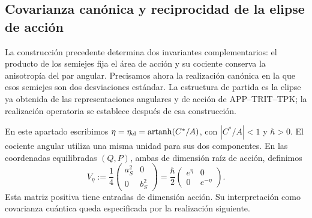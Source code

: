 
\subsection{Covarianza canónica y reciprocidad de la elipse de acción}
\label{sec:ii-area-covarianza}

La construcción precedente determina dos invariantes complementarios:
el producto de los semiejes fija el área de acción y su cociente conserva
la anisotropía del par angular. Precisamos ahora la realización canónica
en la que esos semiejes son dos desviaciones estándar. La estructura de
partida es la elipse ya obtenida de las representaciones angulares y de
acción de APP--TRIT--TPK; la realización operatoria se establece después
de esa construcción.

En este apartado escribimos \(\eta=\eta_{\rm el}
=\operatorname{artanh}(C^*/A)\), con \(|C^*/A|<1\) y
\(\hbar>0\). El cociente angular utiliza una misma unidad para sus dos
componentes. En las coordenadas equilibradas \((Q,P)\), ambas de
dimensión raíz de acción, definimos
\begin{equation}
 V_\eta:=\frac14
 \begin{pmatrix}a_S^2&0\\0&b_S^2\end{pmatrix}
 =\frac{\hbar}{2}
 \begin{pmatrix}e^\eta&0\\0&e^{-\eta}\end{pmatrix}.
 \label{eq:ii-covarianza-geometrica}
\end{equation}
Esta matriz positiva tiene entradas de dimensión acción. Su interpretación
como covarianza cuántica queda especificada por la realización siguiente.

